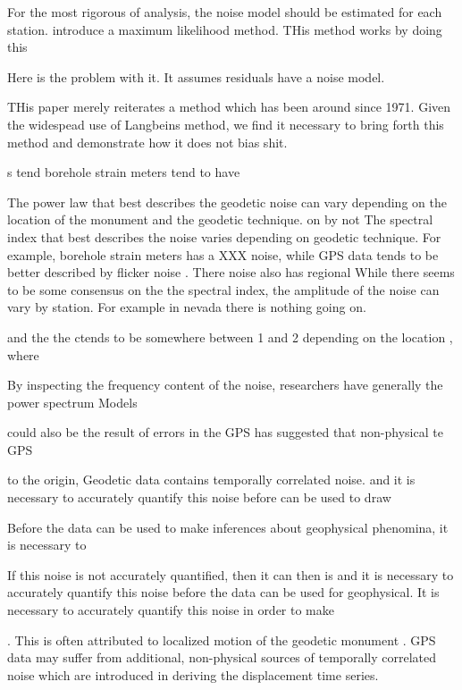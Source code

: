 \documentclass[10pt,a4paper]{article}
\begin{document}
For the most rigorous of analysis, the noise model should be estimated for each station.  \citet{Langbein1997} introduce a maximum likelihood method. THis method works by doing this

Here is the problem with it. It assumes residuals have a noise model. 

THis paper merely reiterates a method which has been around since 1971.  Given the widespead use of Langbeins method, we find it necessary to bring forth this method and demonstrate how it does not bias shit. 

    

  

s tend  borehole strain meters tend to have    

The power law that best describes the geodetic noise can  vary depending on the location of the monument and the geodetic technique. on  by  not The spectral index that best describes the noise varies depending on geodetic technique.  For example, borehole strain meters has a XXX noise, while GPS data tends to be better described by flicker noise \citep{Zhang1997,Mao1999}. There noise also has regional    While there seems to be some consensus on the the spectral index, the amplitude of the noise can vary by station. For example in nevada there is nothing going on.

  

     and the the    ctends to be somewhere between 1 and 2 depending on the location \citep{Langbein2008} , where     \citep{Mao1999}        

By inspecting the frequency content of the noise, researchers have generally  the power spectrum Models   

   could also be the result of errors in the GPS has suggested that non-physical te GPS    

to the  origin, Geodetic data contains temporally correlated noise. and it is necessary to accurately quantify this noise before can be used to draw 
 
Before the data can be used to make inferences about geophysical phenomina, it is necessary to 

If this noise is not accurately quantified, then it can then is  and it is necessary to accurately quantify this noise before the data can be used for geophysical. It is necessary to accurately quantify this noise in order to make 

 \citep{Langbein1997,Zhang1997,Mao1999}. This is often attributed to localized motion of the geodetic monument \citep[e.g][]{Wyatt1982,Wyatt1989,Agnew1992,King2009}. GPS data may suffer from additional, non-physical sources of temporally correlated noise which are introduced in deriving the displacement time series.  
\end{document}

